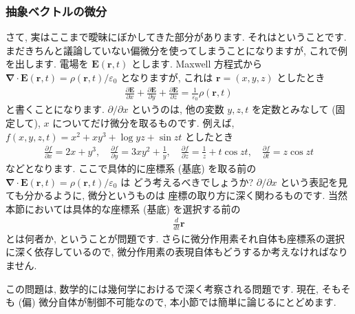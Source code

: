 \documentclass[openany, a4paper, oneside]{book}
\theoremstyle{break}
\theoremstyle{breakdefn}
\newcommand{\vep}{\varepsilon}
\begin{document}
\subsubsection{抽象ベクトルの微分}
\label{sec-4-3-2-3-5}

さて, 実はここまで曖昧にぼかしてきた部分があります.
それはということです.
まだきちんと議論していない偏微分を使ってしまうことになりますが,
これで例を出します.
電場を $\bm{E}(\bm{r}, t)$ とします.
Maxwell 方程式から $\bm{ \nabla } \cdot \bm{E}( \bm{r} , t ) = \rho ( \bm{r} , t ) / \vep_0$ となりますが,
これは $\bm{r} = (x ,y , z)$ としたとき
\begin{gather}
 \frac{ \partial \bm{E} } { \partial x } + \frac{ \partial \bm{E} } { \partial y }
  +\frac{ \partial \bm{E} } { \partial z }
 =
 \frac{1} { \vep _0 } \rho ( \bm{r} , t )
\end{gather}
と書くことになります.
$\partial / \partial x$ というのは,
他の変数 $y,z,t$ を定数とみなして (固定して),
$x$ についてだけ微分を取るものです.
例えば, $f (x, y ,z , t) = x^2 + xy^3 +  \log yz + \sin zt$ としたとき
    \begin{gather}
        \frac{ \partial f } { \partial x }
        =
        2 x + y^3 ,\quad
        \frac{ \partial f } { \partial y }
        =
        3xy^2 + \frac{1} {y} ,\quad
        \frac{ \partial f } { \partial z }
        =
        \frac{1} {z} + t \cos zt ,\quad
        \frac{ \partial f } { \partial t }
        =
        z \cos zt
    \end{gather}
などとなります.
ここで具体的に座標系 (基底) を取る前の $\bm{ \nabla } \cdot \bm{E}( \bm{r} , t ) = \rho ( \bm{r} , t ) / \vep_0$ は
どう考えるべきでしょうか?
$\partial / \partial x$ という表記を見ても分かるように, 微分というものは
座標の取り方に深く関わるものです.
当然本節においては具体的な座標系 (基底) を選択する前の
    \begin{gather}
        \frac{d} {dt} \bm{r}
    \end{gather}
とは何者か, ということが問題です.
さらに微分作用素それ自体も座標系の選択に深く依存しているので,
微分作用素の表現自体もどうするか考えなければなりません.

この問題は, 数学的には幾何学におけるで深く考察される問題です.
現在, そもそも (偏) 微分自体が制御不可能なので, 本小節では簡単に論じるにとどめます.
\end{document}
